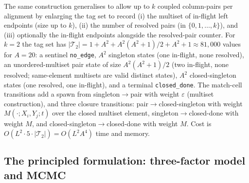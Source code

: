 The same construction generalises to allow up to $k$ coupled
column-pairs per alignment by enlarging the tag set to record
(i) the multiset of in-flight left endpoints (size up to $k$),
(ii) the number of resolved pairs (in $\{0, 1, \ldots, k\}$), and
(iii) optionally the in-flight endpoints alongside the resolved-pair
counter. For $k = 2$ the tag set has
$|\mathcal{T}_2| = 1 + A^2 + A^2(A^2+1)/2 + A^2 + 1 \approx 81{,}000$
values for $A = 20$: a sentinel \texttt{no\_edge}, $A^2$ singleton
states (one in-flight, none resolved), an unordered-multiset pair
state of size $A^2(A^2+1)/2$ (two in-flight, none resolved;
same-element multisets are valid distinct states), $A^2$
closed-singleton states (one resolved, one in-flight), and a
terminal \texttt{closed\_done}. The match-cell transitions add a
spawn from singleton$\to$pair with weight $\varepsilon$ (multiset
construction), and three closure transitions:
pair$\to$closed-singleton with weight $M(\cdot;X_i,Y_j;t)$ over the
closed multiset element, singleton$\to$closed-done with weight $M$,
and closed-singleton$\to$closed-done with weight $M$. Cost is
$O(L^2 \cdot 5 \cdot |\mathcal{T}_2|) = O(L^2 A^4)$ time and memory.

\subsection{The principled formulation: three-factor model and MCMC}
\label{sec:infinite-hmm}

